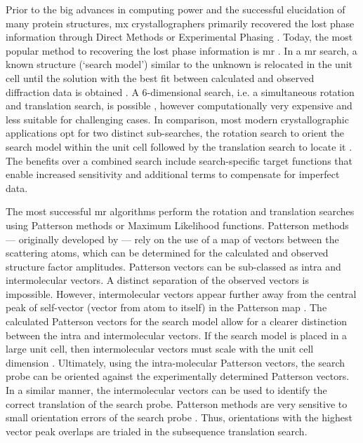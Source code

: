 Prior to the big advances in computing power and the successful elucidation of many protein structures, \gls{mx} crystallographers primarily recovered the lost phase information through Direct Methods or Experimental Phasing \cite{Rupp2010-nc}. Today, the most popular method to recovering the lost phase information is \gls{mr} \cite{Rossmann2001-yw,Rossmann1990-am}. In a \Gls{mr} search, a known structure (`search model') similar to the unknown is relocated in the unit cell until the solution with the best fit between calculated and observed diffraction data is obtained \cite{Rupp2010-nc}. A 6-dimensional search, i.e. a simultaneous rotation and translation search, is possible \cite{Kissinger1999-ho,Glykos2000-gc,Read2001-nu}, however computationally very expensive and less suitable for challenging cases. In comparison, most modern crystallographic applications opt for two distinct sub-searches, the rotation search to orient the search model within the unit cell followed by the translation search to locate it \cite{Rupp2010-nc}. The benefits over a combined search include search-specific target functions that enable increased sensitivity and additional terms to compensate for imperfect data. 

The most successful \gls{mr} algorithms perform the rotation and translation searches using Patterson methods or Maximum Likelihood functions. Patterson methods --- originally developed by \textcite{Rossmann1962-ou} --- rely on the use of a map of vectors between the scattering atoms, which can be determined for the calculated and observed structure factor amplitudes. Patterson vectors can be sub-classed as intra and intermolecular vectors. A distinct separation of the observed vectors is impossible. However, intermolecular vectors appear further away from the central peak of self-vector (vector from atom to itself) in the Patterson map \cite{Rupp2010-nc}. The calculated Patterson vectors for the search model allow for a clearer distinction between the intra and intermolecular vectors. If the search model is placed in a large unit cell, then intermolecular vectors must scale with the unit cell dimension \cite{Rupp2010-nc}. Ultimately, using the intra-molecular Patterson vectors, the search probe can be oriented against the experimentally determined Patterson vectors. In a similar manner, the intermolecular vectors can be used to identify the correct translation of the search probe. Patterson methods are very sensitive to small orientation errors of the search probe \cite{Rupp2010-nc}. Thus, orientations with the highest vector peak overlaps are trialed in the subsequence translation search.

